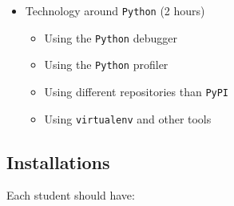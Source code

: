 \documentclass[
]{article}
\providecommand{\tightlist}{%
  \setlength{\itemsep}{0pt}\setlength{\parskip}{0pt}}
\begin{document}
\begin{itemize}
\begin{itemize}
    \begin{itemize}
    \tightlist
    \item
      Testing your modules using \texttt{pytest}
    \end{itemize}
  \item
    Distributing modules using \texttt{setuptools} and
    \texttt{distutils}
  \end{itemize}
\item
  Technology around \texttt{Python} (2 hours)

  \begin{itemize}
  \tightlist
  \item
    Using the \texttt{Python} debugger
  \item
    Using the \texttt{Python} profiler
  \item
    Using different repositories than \texttt{PyPI}
  \item
    Using \texttt{virtualenv} and other tools
  \end{itemize}
\end{itemize}

\subsection{Installations}\label{installations}

Each student should have:
\end{document}
